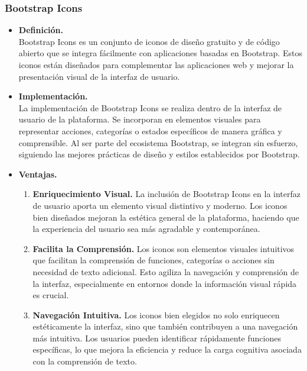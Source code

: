 \documentclass{article}
\begin{document}
        \subsubsection{Bootstrap Icons}
            \begin{itemize}
                \item \textbf{Definición.}\\
                Bootstrap Icons es un conjunto de iconos de diseño gratuito y de código abierto que se integra fácilmente con aplicaciones basadas en Bootstrap. Estos iconos están diseñados para complementar las aplicaciones web y mejorar la presentación visual de la interfaz de usuario.

                \item \textbf{Implementación.}\\
                La implementación de Bootstrap Icons se realiza dentro de la interfaz de usuario de la plataforma. Se incorporan en elementos visuales para representar acciones, categorías o estados específicos de manera gráfica y comprensible. Al ser parte del ecosistema Bootstrap, se integran sin esfuerzo, siguiendo las mejores prácticas de diseño y estilos establecidos por Bootstrap.

                \item \textbf{Ventajas.}\\
                \begin{enumerate}
                    \item \textbf{Enriquecimiento Visual.} La inclusión de Bootstrap Icons en la interfaz de usuario aporta un elemento visual distintivo y moderno. Los iconos bien diseñados mejoran la estética general de la plataforma, haciendo que la experiencia del usuario sea más agradable y contemporánea.

                    \item \textbf{Facilita la Comprensión.} Los iconos son elementos visuales intuitivos que facilitan la comprensión de funciones, categorías o acciones sin necesidad de texto adicional. Esto agiliza la navegación y comprensión de la interfaz, especialmente en entornos donde la información visual rápida es crucial.

                    \item \textbf{Navegación Intuitiva.} Los iconos bien elegidos no solo enriquecen estéticamente la interfaz, sino que también contribuyen a una navegación más intuitiva. Los usuarios pueden identificar rápidamente funciones específicas, lo que mejora la eficiencia y reduce la carga cognitiva asociada con la comprensión de texto.


\end{enumerate}
\end{itemize}
\end{document}
